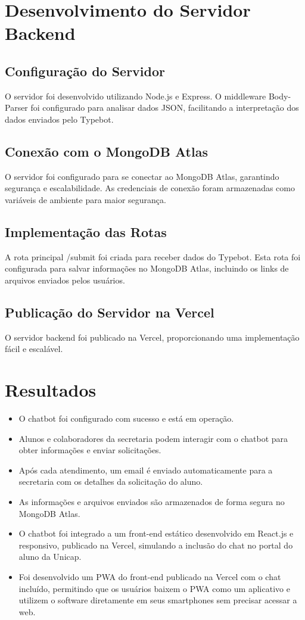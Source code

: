 \documentclass[12pt,a4paper]{article} %
\begin{document}
\section{Desenvolvimento do Servidor Backend}
 
\subsection{Configuração do Servidor}
O servidor foi desenvolvido utilizando Node.js e Express. O middleware Body-Parser foi configurado para analisar dados JSON, facilitando a interpretação dos dados enviados pelo Typebot.
 
\subsection{Conexão com o MongoDB Atlas}
O servidor foi configurado para se conectar ao MongoDB Atlas, garantindo segurança e escalabilidade. As credenciais de conexão foram armazenadas como variáveis de ambiente para maior segurança.
 
\subsection{Implementação das Rotas}
A rota principal /submit foi criada para receber dados do Typebot. Esta rota foi configurada para salvar informações no MongoDB Atlas, incluindo os links de arquivos enviados pelos usuários.
 
\subsection{Publicação do Servidor na Vercel}
O servidor backend foi publicado na Vercel, proporcionando uma implementação fácil e escalável.

\section{Resultados}

\begin{itemize}
    \item O chatbot foi configurado com sucesso e está em operação.
    \item Alunos e colaboradores da secretaria podem interagir com o chatbot para obter informações e enviar solicitações.
    \item Após cada atendimento, um email é enviado automaticamente para a secretaria com os detalhes da solicitação do aluno.
    \item As informações e arquivos enviados são armazenados de forma segura no MongoDB Atlas.
    \item O chatbot foi integrado a um front-end estático desenvolvido em React.js e responsivo, publicado na Vercel, simulando a inclusão do chat no portal do aluno da Unicap.
    \item Foi desenvolvido um PWA do front-end publicado na Vercel com o chat incluído, permitindo que os usuários baixem o PWA como um aplicativo e utilizem o software diretamente em seus smartphones sem precisar acessar a web.
\end{itemize}
\end{document}
